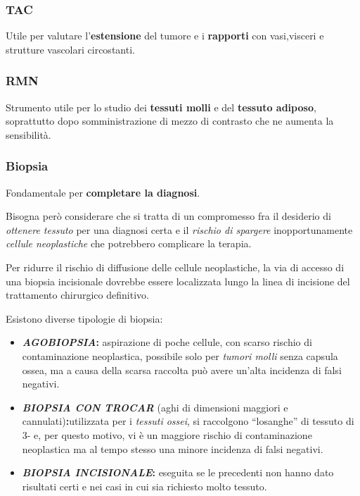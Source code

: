 \subsubsection{TAC}

Utile per valutare l'\textbf{estensione} del tumore e i
\textbf{rapporti} con vasi,visceri e strutture vascolari circostanti.

\subsubsection{RMN}

Strumento utile per lo studio dei \textbf{tessuti molli} e del \textbf{tessuto adiposo}, soprattutto dopo somministrazione di mezzo di contrasto che ne aumenta la sensibilità.

\subsubsection{Biopsia}

Fondamentale per \textbf{completare la diagnosi}.

Bisogna però considerare che si tratta di un compromesso fra il desiderio di \emph{ottenere tessuto} per una diagnosi certa e il \emph{rischio di spargere} inopportunamente \emph{cellule neoplastiche} che potrebbero complicare la terapia.

Per ridurre il rischio di diffusione delle cellule neoplastiche, la via di accesso di una biopsia incisionale dovrebbe essere localizzata lungo la linea di incisione del trattamento chirurgico definitivo.

Esistono diverse tipologie di biopsia:

\begin{itemize}
\item
  \textbf{\emph{AGOBIOPSIA}:} aspirazione di poche cellule, con scarso rischio di contaminazione neoplastica, possibile solo per \emph{tumori molli} senza capsula ossea, ma a causa della scarsa raccolta può avere un'alta incidenza di falsi negativi.
\item
  \textbf{\emph{BIOPSIA CON TROCAR}} (aghi di dimensioni maggiori e cannulati)\textbf{:}utilizzata per i \emph{tessuti ossei}, si raccolgono ``losanghe'' di tessuto di 3- e, per questo motivo, vi è un maggiore rischio di contaminazione neoplastica ma al tempo stesso una minore incidenza di falsi negativi.
\item
  \textbf{\emph{BIOPSIA INCISIONALE}:} eseguita se le precedenti non hanno dato risultati certi e nei casi in cui sia richiesto molto tessuto.
\end{itemize}

